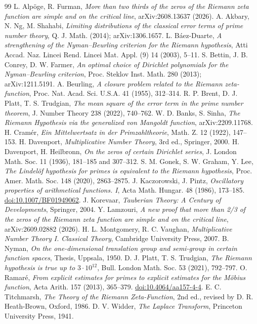 \documentclass[11pt]{amsart}
\theoremstyle{remark}
\theoremstyle{definition}
\begin{document}
\begin{thebibliography}{99}
 L. Alp\"oge, R. Furman, \emph{More than two thirds of the zeros of the Riemann zeta function are simple and on the critical line}, arXiv:2608.13637 (2026).
 A. Akbary, N. Ng, M. Shahabi, \emph{Limiting distributions of the classical error terms of prime number theory}, Q. J. Math. (2014); arXiv:1306.1657.
 L. B\'aez-Duarte, \emph{A strengthening of the Nyman--Beurling criterion for the Riemann hypothesis}, Atti Accad. Naz. Lincei Rend. Lincei Mat. Appl. (9) 14 (2003), 5--11.
 S. Bettin, J. B. Conrey, D. W. Farmer, \emph{An optimal choice of Dirichlet polynomials for the Nyman--Beurling criterion}, Proc. Steklov Inst. Math. 280 (2013); arXiv:1211.5191.
 A. Beurling, \emph{A closure problem related to the Riemann zeta-function}, Proc. Nat. Acad. Sci. U.S.A. 41 (1955), 312--314.
 R. P. Brent, D. J. Platt, T. S. Trudgian, \emph{The mean square of the error term in the prime number theorem}, J. Number Theory 238 (2022), 740--762.
 W. D. Banks, S. Sinha, \emph{The Riemann Hypothesis via the generalized von Mangoldt function}, arXiv:2209.11768.
 H. Cram\'er, \emph{Ein Mittelwertsatz in der Primzahltheorie}, Math. Z. 12 (1922), 147--153.
 H. Davenport, \emph{Multiplicative Number Theory}, 3rd ed., Springer, 2000.
 H. Davenport, H. Heilbronn, \emph{On the zeros of certain Dirichlet series}, J. London Math. Soc. 11 (1936), 181--185 and 307--312.
 S. M. Gonek, S. W. Graham, Y. Lee, \emph{The Lindel\"of hypothesis for primes is equivalent to the Riemann hypothesis}, Proc. Amer. Math. Soc. 148 (2020), 2863--2875.
 J. Kaczorowski, J. Pintz, \emph{Oscillatory properties of arithmetical functions. I}, Acta Math. Hungar. 48 (1986), 173--185. \href{https://doi.org/10.1007/BF01949062}{doi:10.1007/BF01949062}.
 J. Korevaar, \emph{Tauberian Theory: A Century of Developments}, Springer, 2004.
 Y. Lamzouri, \emph{A new proof that more than 2/3 of the zeros of the Riemann zeta function are simple and on the critical line}, arXiv:2609.02882 (2026).
 H. L. Montgomery, R. C. Vaughan, \emph{Multiplicative Number Theory I. Classical Theory}, Cambridge University Press, 2007.
 B. Nyman, \emph{On the one-dimensional translation group and semi-group in certain function spaces}, Thesis, Uppsala, 1950.
 D. J. Platt, T. S. Trudgian, \emph{The Riemann hypothesis is true up to $3\cdot10^{12}$}, Bull. London Math. Soc. 53 (2021), 792--797.
 O. Ramar\'e, \emph{From explicit estimates for primes to explicit estimates for the M\"obius function}, Acta Arith. 157 (2013), 365--379. \href{https://doi.org/10.4064/aa157-4-4}{doi:10.4064/aa157-4-4}.
 E. C. Titchmarsh, \emph{The Theory of the Riemann Zeta-Function}, 2nd ed., revised by D. R. Heath-Brown, Oxford, 1986.
 D. V. Widder, \emph{The Laplace Transform}, Princeton University Press, 1941.
\end{thebibliography}
\end{document}
